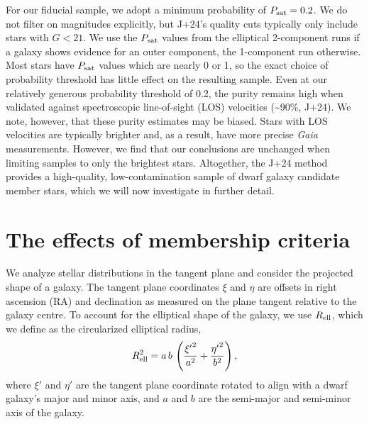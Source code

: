 For our fiducial sample, we adopt a minimum probability of
\(P_{\rm sat} = 0.2\). We do not filter on magnitudes explicitly, but
J+24's quality cuts typically only include stars with \(G < 21\). We use
the \(P_{\rm sat}\) values from the elliptical 2-component runs if a
galaxy shows evidence for an outer component, the 1-component run
otherwise. Most stars have \(P_{\rm  sat}\) values which are nearly 0 or
1, so the exact choice of probability threshold has little effect on the
resulting sample. Even at our relatively generous probability threshold
of 0.2, the purity remains high when validated against spectroscopic
line-of-sight (LOS) velocities (\textasciitilde90\%, J+24). We note,
however, that these purity estimates may be biased. Stars with LOS
velocities are typically brighter and, as a result, have more precise
\emph{Gaia} measurements. However, we find that our conclusions are
unchanged when limiting samples to only the brightest stars. Altogether,
the J+24 method provides a high-quality, low-contamination sample of
dwarf galaxy candidate member stars, which we will now investigate in
further detail.

\section{The effects of membership
criteria}\label{the-effects-of-membership-criteria}

We analyze stellar distributions in the tangent plane and consider the
projected shape of a galaxy. The tangent plane coordinates \(\xi\) and
\(\eta\) are offsets in right ascension (RA) and declination as measured
on the plane tangent relative to the galaxy centre. To account for the
elliptical shape of the galaxy, we use \(R_{\rm ell}\), which we define
as the circularized elliptical radius, \begin{equation}{
R_{\rm ell}^2 = a\,b\,\left(\frac{{\xi'}^2}{a^2} + \frac{{\eta'}^2}{b^2} \right),
}\end{equation} where \(\xi'\) and \(\eta'\) are the tangent plane
coordinate rotated to align with a dwarf galaxy's major and minor axis,
and \(a\) and \(b\) are the semi-major and semi-minor axis of the
galaxy.

